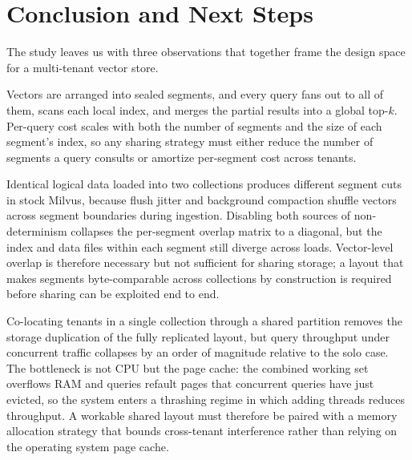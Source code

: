 \section{Conclusion and Next Steps}

The study leaves us with three observations that together frame the
design space for a multi-tenant vector store.

 Vectors are arranged
into sealed segments, and every query fans out to all of them,
scans each local index, and merges the partial results into a
global top-$k$. Per-query cost scales with both the number of
segments and the size of each segment's index, so any sharing
strategy must either reduce the number of segments a query
consults or amortize per-segment cost across tenants.

 Identical
logical data loaded into two collections produces different
segment cuts in stock Milvus, because flush jitter and background
compaction shuffle vectors across segment boundaries during
ingestion. Disabling both sources of non-determinism collapses
the per-segment overlap matrix to a diagonal, but the index and
data files within each segment still diverge across loads.
Vector-level overlap is therefore necessary but not sufficient
for sharing storage; a layout that makes segments byte-comparable
across collections by construction is required before sharing
can be exploited end to end.

 Co-locating
tenants in a single collection through a shared partition
removes the storage duplication of the fully replicated layout,
but query throughput under concurrent traffic collapses by an
order of magnitude relative to the solo case. The bottleneck is
not CPU but the page cache: the combined working set overflows
RAM and queries refault pages that concurrent queries have just
evicted, so the system enters a thrashing regime in which adding
threads reduces throughput. A workable shared layout must
therefore be paired with a memory allocation strategy that
bounds cross-tenant interference rather than relying on the
operating system page cache.

